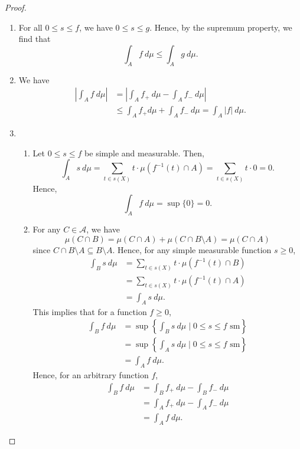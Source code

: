 \documentclass[a4paper, openany]{memoir}
\theoremstyle{definition}
\theoremstyle{plain}
\begin{document}
\begin{proof}
\begin{enumerate}
            \item For all $0 \leq s \leq f$, we have $0 \leq s \leq g$. Hence, by the supremum property, we find that
            \[\int_A f \ d\mu \leq \int_A g \ d\mu.\]

            \item We have
            \begin{align*}
                \left| \int_A f \ d\mu\right| &= \left|\int_A f_+ \ d\mu - \int_A f_- \ d\mu\right| \\
                &\leq \int_A f_+ d\mu + \int_A f_- \ d\mu = \int_A |f| \ d\mu.
            \end{align*}
            
            \item \begin{enumerate}
                \item Let $0 \leq s \leq f$ be simple and measurable. Then,
                \[\int_A s \ d\mu = \sum_{t \in s(X)} t \cdot \mu(f^{-1}(t) \cap A) = \sum_{t \in s(X)} t \cdot 0 = 0.\]
                Hence,
                \[\int_A f \ d\mu = \sup \{0\} = 0.\]
                
                \item For any $C \in \mathcal{A}$, we have
                \[\mu(C \cap B) = \mu(C \cap A) + \mu(C \cap B \setminus A) = \mu(C \cap A)\]
                since $C \cap B \setminus A \subseteq B \setminus A$. Hence, for any simple measurable function $s \geq 0$,
                \begin{align*}
                    \int_B s \ d\mu &= \sum_{t \in s(X)} t \cdot \mu(f^{-1}(t) \cap B) \\
                    &= \sum_{t \in s(X)} t \cdot \mu(f^{-1}(t) \cap A) \\
                    &= \int_A s \ d\mu.
                \end{align*}
                This implies that for a function $f \geq 0$,
                \begin{align*}
                    \int_B f \ d\mu &= \sup \left\{\int_B s \ d\mu \mid 0 \leq s \leq f \textrm{ sm}\right\} \\
                    &= \sup \left\{\int_A s \ d\mu \mid 0 \leq s \leq f \textrm{ sm}\right\} \\
                    &= \int_A f \ d\mu.
                \end{align*}
                Hence, for an arbitrary function $f$,
                \begin{align*}
                    \int_B f \ d\mu &= \int_B f_+ \ d\mu - \int_B f_- \ d\mu \\
                    &= \int_A f _+ \ d\mu - \int_A f_- \ d\mu \\
                    &= \int_A f \ d\mu.
                \end{align*}


\end{enumerate}
\end{enumerate}
\end{proof}
\end{document}

